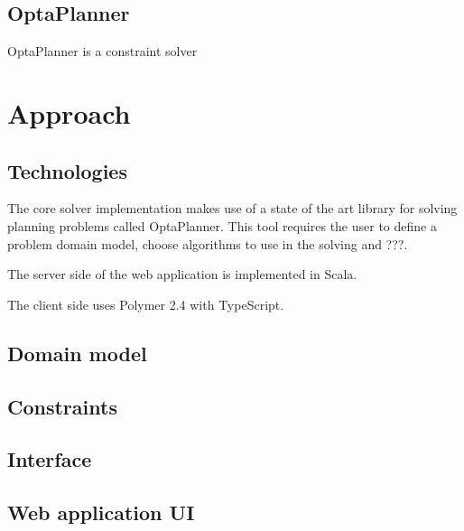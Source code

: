 \documentclass[12pt, a4paper, english]{report}
\begin{document}
\section{OptaPlanner}
OptaPlanner is a constraint solver

\chapter{Approach}

\section{Technologies}
The core solver implementation makes use of a state of the art library for solving planning problems called OptaPlanner. This tool requires the user to define a problem domain model, choose algorithms to use in the solving and ???.\par
The server side of the web application is implemented in Scala.\par
The client side uses Polymer 2.4 with TypeScript.

\section{Domain model}

\section{Constraints}

\section{Interface}

\section{Web application UI}
\end{document}
